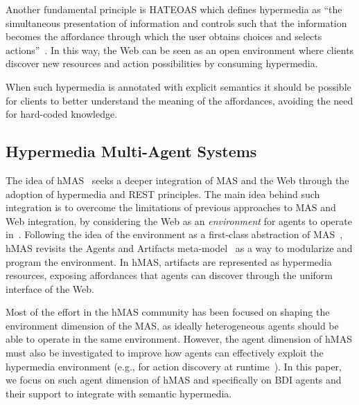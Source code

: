 \documentclass[
]{ceurart}
\begin{document}
Another fundamental principle is \ac{HATEOAS} which defines hypermedia as ``the simultaneous presentation of information and controls such that the information becomes the affordance through which the user obtains choices and selects actions''~\cite{DBLP:journals/toit/FieldingT02}.
In this way, the Web can be seen as an open environment
where clients discover new resources and action possibilities by consuming hypermedia.

When such hypermedia is annotated with explicit semantics it should be possible for clients to better understand the meaning of the affordances, avoiding the need for hard-coded knowledge.
%


\subsection{Hypermedia Multi-Agent Systems}

The idea of \ac{hMAS}~\cite{DBLP:conf/atal/CiorteaMGBRZ19} seeks a deeper integration of \ac{MAS} and the Web through the adoption of hypermedia and \ac{REST} principles.
%
The main idea behind such integration is to overcome the limitations of previous approaches to \ac{MAS} and Web integration, by considering the Web as an \emph{environment} for agents to operate in~\cite{ciortea2018emas}.
%
Following the idea of the environment as a first-class abstraction of \ac{MAS}~\cite{weyns2007aamas},
\ac{hMAS} revisits the Agents and Artifacts meta-model~\cite{ricci2011aamas} as a way to modularize and program the environment.
%
In \ac{hMAS}, artifacts are represented as hypermedia resources, exposing affordances that agents can discover through the uniform interface of the Web.

Most of the effort in the \ac{hMAS} community has been focused on shaping the environment dimension of the \ac{MAS}, as ideally heterogeneous agents should be able to operate in the same environment.
%
However, the agent dimension of \ac{hMAS} must also be investigated to improve how agents can effectively exploit the hypermedia environment (e.g., for action discovery at runtime~\cite{vachtsevanou2024atal}).
%
In this paper, we focus on such agent dimension of \ac{hMAS} and specifically on \ac{BDI} agents and their support to integrate with semantic hypermedia.
\end{document}
